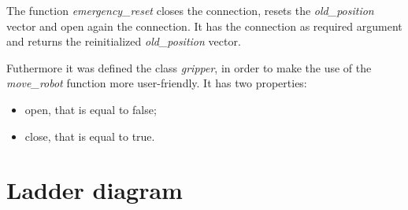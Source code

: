 

The function \textit{emergency\_reset} closes the connection, resets the \textit{old\_position} vector and open again the connection. It has the connection as required argument and returns the reinitialized \textit{old\_position} vector.



Futhermore it was defined the class \textit{gripper}, in order to make the use of the \textit{move\_robot} function more user-friendly. It has two properties:
\begin{itemize}
    \item open, that is equal to false;
    \item close, that is equal to true.
\end{itemize}









\section{Ladder diagram}
